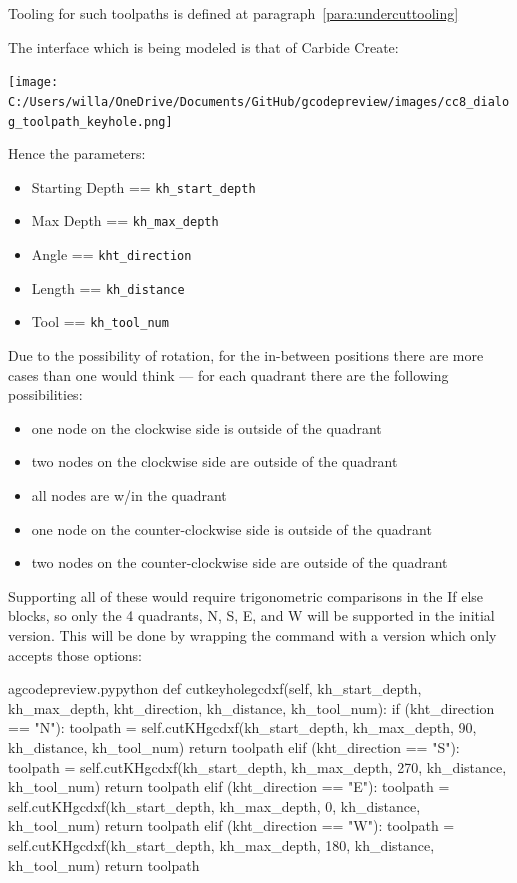 \documentclass{ltxdoc}
\begin{document}
Tooling for such toolpaths is defined at paragraph~\ref{para:undercuttooling}

The interface which is being modeled is that of Carbide Create:

\begin{centering}
\texttt{[image: C:/Users/willa/OneDrive/Documents/GitHub/gcodepreview/images/cc8\_dialog\_toolpath\_keyhole.png]}\par
\end{centering}

\noindent Hence the parameters:

\begin{itemize}
\item Starting Depth == \verb|kh_start_depth|
\item Max Depth == \verb|kh_max_depth|
\item Angle == \verb|kht_direction|
\item Length == \verb|kh_distance|
\item Tool == \verb|kh_tool_num|
\end{itemize}

Due to the possibility of rotation, for the in-between positions there are more cases than one would think — for each quadrant there are the following possibilities:

\begin{itemize}
 \item one node on the clockwise side is outside of the quadrant
 \item two nodes on the clockwise side are outside of the quadrant
 \item all nodes are w/in the quadrant
 \item one node on the counter-clockwise side is outside of the quadrant
 \item two nodes on the counter-clockwise side are outside of the quadrant
\end{itemize}
 
Supporting all of these would require trigonometric comparisons in the If else blocks, so only the 4 quadrants, N, S, E, and W will be supported in the initial version. This will be done by wrapping the command with a version which only accepts those options: 

\lstset{firstnumber=\thegcpy}
\begin{writecode}{a}{gcodepreview.py}{python}
    def cutkeyholegcdxf(self, kh_start_depth, kh_max_depth, kht_direction, kh_distance, kh_tool_num):   
        if (kht_direction == "N"): 
            toolpath = self.cutKHgcdxf(kh_start_depth, kh_max_depth, 90, kh_distance, kh_tool_num)
            return toolpath
        elif (kht_direction == "S"):
            toolpath = self.cutKHgcdxf(kh_start_depth, kh_max_depth, 270, kh_distance, kh_tool_num)
            return toolpath
        elif (kht_direction == "E"):
            toolpath = self.cutKHgcdxf(kh_start_depth, kh_max_depth, 0, kh_distance, kh_tool_num)
            return toolpath
        elif (kht_direction == "W"):
            toolpath = self.cutKHgcdxf(kh_start_depth, kh_max_depth, 180, kh_distance, kh_tool_num)
            return toolpath

\end{writecode}
\addtocounter{gcpy}{14}
 
\end{document}
